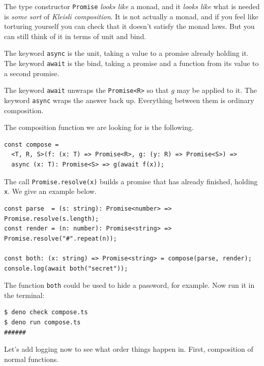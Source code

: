 \documentclass[11pt,a4paper]{article}
\begin{document}
\newpage

\begin{sectionbox}
The type constructor \texttt{Promise} \emph{looks like} a monad, and it \emph{looks like} what is
needed is \emph{some sort} of \emph{Kleisli composition}. It is not actually a monad, and if you
feel like torturing yourself you can check that it doesn't satisfy the monad laws. But you can
still think of it in terms of unit and bind.

The keyword \texttt{async} is the unit, taking a value to a promise already holding it. The
keyword \texttt{await} is the bind, taking a promise and a function from its value to a second
promise.

The keyword \texttt{await} unwraps the \texttt{Promise<R>} so that $g$ may be applied to it. The
keyword \texttt{async} wraps the answer back up. Everything between them is ordinary
composition.
\end{sectionbox}

The composition function we are looking for is the following.

\begin{lstlisting}[language=TS]
const compose =
  <T, R, S>(f: (x: T) => Promise<R>, g: (y: R) => Promise<S>) =>
  async (x: T): Promise<S> => g(await f(x));
\end{lstlisting}

The call \texttt{Promise.resolve(x)} builds a promise that has already finished, holding
\texttt{x}. We give an example below.

\begin{lstlisting}[language=TS]
const parse  = (s: string): Promise<number> => Promise.resolve(s.length);
const render = (n: number): Promise<string> => Promise.resolve("#".repeat(n));

const both: (x: string) => Promise<string> = compose(parse, render);
console.log(await both("secret"));
\end{lstlisting}

The function \texttt{both} could be used to hide a password, for example. Now run it in the
terminal:

\begin{lstlisting}[language=SH]
$ deno check compose.ts
$ deno run compose.ts
######
\end{lstlisting}

\newpage

Let's add logging now to see what order things happen in. First, composition of normal functions.
\end{document}
